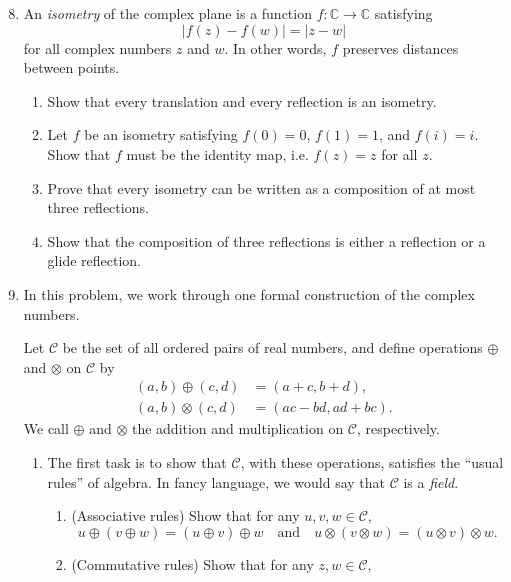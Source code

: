 \begin{enumerate}\setcounter{enumi}{7}
\item An \emph{isometry} of the complex plane is a function $f:\mathbb{C}\to\mathbb{C}$ satisfying
\begin{equation*}
\lvert f(z) - f(w)\rvert = \lvert z - w\rvert
\end{equation*}
for all complex numbers $z$ and $w$. In other words, $f$ preserves distances between points.
\begin{enumerate}
\item Show that every translation and every reflection is an isometry.
\item Let $f$ be an isometry satisfying $f(0) = 0$, $f(1) = 1$, and $f(i) = i$. Show that $f$ must be the identity map, i.e. $f(z) = z$ for all $z$.
\item Prove that every isometry can be written as a composition of at most three reflections.
\item Show that the composition of three reflections is either a reflection or a glide reflection.
\end{enumerate}
\item In this problem, we work through one formal construction of the complex numbers.\par 
Let $\mathcal{C}$ be the set of all ordered pairs of real numbers, and define operations $\oplus$ and $\otimes$ on $\mathcal{C}$ by
\begin{align*}
(a,b)\oplus (c,d) &= (a + c, b + d), \\
(a,b)\otimes (c,d) &= (ac - bd, ad + bc).
\end{align*}
We call $\oplus$ and $\otimes$ the addition and multiplication on $\mathcal{C}$, respectively.
\begin{enumerate}
\item The first task is to show that $\mathcal{C}$, with these operations, satisfies the ``usual rules'' of algebra. In fancy language, we would say that $\mathcal{C}$ is a \emph{field}.
\begin{enumerate}
\item (Associative rules) Show that for any $u,v,w\in\mathcal{C}$,
\begin{equation*}
u\oplus (v\oplus w) = (u\oplus v)\oplus w\quad\text{and}\quad u\otimes (v\otimes w) = (u\otimes v)\otimes w.
\end{equation*}
\item (Commutative rules) Show that for any $z,w\in\mathcal{C}$,
\begin{equation*}

\end{equation*}
\end{enumerate}
\end{enumerate}
\end{enumerate}
